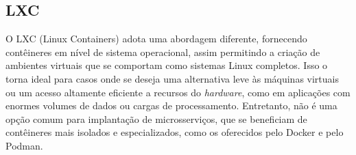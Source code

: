 \subsection*{LXC}
O LXC (Linux Containers) adota uma abordagem diferente, fornecendo contêineres em nível de sistema operacional, assim permitindo a criação de ambientes virtuais que se comportam como sistemas Linux completos. Isso o torna ideal para casos onde se deseja uma alternativa leve às máquinas virtuais ou um acesso altamente eficiente a recursos do \emph{hardware}, como em aplicações com enormes volumes de dados ou cargas de processamento. Entretanto, não é uma opção comum para implantação de microsserviços, que se beneficiam de contêineres mais isolados e especializados, como os oferecidos pelo Docker e pelo Podman. \cite{lxc-vs-docker}








